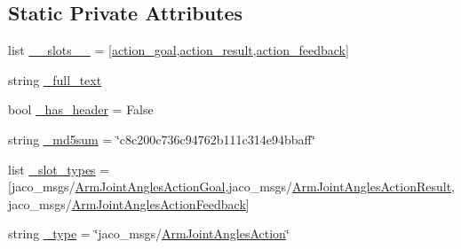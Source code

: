 \subsection*{Static Private Attributes}
\begin{DoxyCompactItemize}
\item 
list \hyperlink{classjaco__msgs_1_1msg_1_1__ArmJointAnglesAction_1_1ArmJointAnglesAction_a57491367ef53058c2c9505d1e6ea8961}{\+\_\+\+\_\+slots\+\_\+\+\_\+} = \mbox{[}\textquotesingle{}\hyperlink{classjaco__msgs_1_1msg_1_1__ArmJointAnglesAction_1_1ArmJointAnglesAction_a1228b85cf05f4f9a13183afd184c00ac}{action\+\_\+goal}\textquotesingle{},\textquotesingle{}\hyperlink{classjaco__msgs_1_1msg_1_1__ArmJointAnglesAction_1_1ArmJointAnglesAction_ac598eb04beb335c402cad157a16c96e5}{action\+\_\+result}\textquotesingle{},\textquotesingle{}\hyperlink{classjaco__msgs_1_1msg_1_1__ArmJointAnglesAction_1_1ArmJointAnglesAction_a1d46fe85cd4ccda32ecdf75ac8f172aa}{action\+\_\+feedback}\textquotesingle{}\mbox{]}
\item 
string \hyperlink{classjaco__msgs_1_1msg_1_1__ArmJointAnglesAction_1_1ArmJointAnglesAction_ab0b09cf8842ea9c945c816dce993b09c}{\+\_\+full\+\_\+text}
\item 
bool \hyperlink{classjaco__msgs_1_1msg_1_1__ArmJointAnglesAction_1_1ArmJointAnglesAction_ad7420d4cbbc3257eab5788b11793076e}{\+\_\+has\+\_\+header} = False
\item 
string \hyperlink{classjaco__msgs_1_1msg_1_1__ArmJointAnglesAction_1_1ArmJointAnglesAction_a9d71e8e6c56c0c3b9a752e975c8e965f}{\+\_\+md5sum} = \char`\"{}c8c200c736c94762b111c314e94bbaff\char`\"{}
\item 
list \hyperlink{classjaco__msgs_1_1msg_1_1__ArmJointAnglesAction_1_1ArmJointAnglesAction_a160e44c2217af3ed88a1efeb5595d6db}{\+\_\+slot\+\_\+types} = \mbox{[}\textquotesingle{}jaco\+\_\+msgs/\hyperlink{classjaco__msgs_1_1msg_1_1__ArmJointAnglesActionGoal_1_1ArmJointAnglesActionGoal}{Arm\+Joint\+Angles\+Action\+Goal}\textquotesingle{},\textquotesingle{}jaco\+\_\+msgs/\hyperlink{classjaco__msgs_1_1msg_1_1__ArmJointAnglesActionResult_1_1ArmJointAnglesActionResult}{Arm\+Joint\+Angles\+Action\+Result}\textquotesingle{},\textquotesingle{}jaco\+\_\+msgs/\hyperlink{classjaco__msgs_1_1msg_1_1__ArmJointAnglesActionFeedback_1_1ArmJointAnglesActionFeedback}{Arm\+Joint\+Angles\+Action\+Feedback}\textquotesingle{}\mbox{]}
\item 
string \hyperlink{classjaco__msgs_1_1msg_1_1__ArmJointAnglesAction_1_1ArmJointAnglesAction_ae31ee133182188c7f546b780bc5e29a6}{\+\_\+type} = \char`\"{}jaco\+\_\+msgs/\hyperlink{classjaco__msgs_1_1msg_1_1__ArmJointAnglesAction_1_1ArmJointAnglesAction}{Arm\+Joint\+Angles\+Action}\char`\"{}
\end{DoxyCompactItemize}


